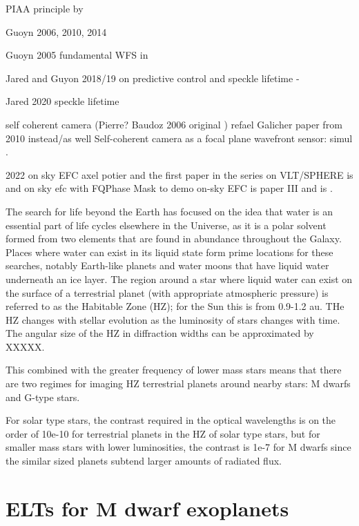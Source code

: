 \documentclass[letterpaper]{ar-1col}
\begin{document}
PIAA principle by \citet{Guyon03}


Guoyn 2006, 2010, 2014 


Guoyn 2005 fundamental WFS in \citet{Guyon05-1}

Jared and Guyon 2018/19 on predictive control and speckle lifetime - \citep{Males18}


Jared 2020 speckle lifetime \citep{Males21}

self coherent camera (Pierre? Baudoz 2006 original \citep{Baudoz06}) refael Galicher paper from 2010 instead/as well Self-coherent camera as a focal plane wavefront sensor: simul \citep{Galicher10}.




2022 on sky EFC axel potier \citep{Potier22} and the first paper in the series on VLT/SPHERE is \citep{Potier20} and on sky efc with FQPhase Mask to demo on-sky EFC is paper III and is \citet{Galicher24}.



The search for life beyond the Earth has focused on the idea that water is an essential part of life cycles elsewhere in the Universe, as it is a polar solvent formed from two elements that are found in abundance throughout the Galaxy.
%
Places where water can exist in its liquid state form prime locations for these searches, notably Earth-like planets and water moons that have liquid water underneath an ice layer.
%
The region around a star where liquid water can exist on the surface of a terrestrial planet (with appropriate atmospheric pressure) is referred to as the Habitable Zone (HZ); for the Sun this is from 0.9-1.2 au.
%
THe HZ changes with stellar evolution as the luminosity of stars changes with time.
%
The angular size of the HZ in diffraction widths can be approximated by XXXXX. 

This combined with the greater frequency of lower mass stars means that there are two regimes for imaging HZ terrestrial planets around nearby stars: M dwarfs and G-type stars.

For solar type stars, the contrast required in the optical wavelengths is on the order of 10e-10 for terrestrial planets in the HZ of solar type stars, but for smaller mass stars with lower luminosities, the contrast is 1e-7 for M dwarfs since the similar sized planets subtend larger amounts of radiated flux.
%
\section{ELTs for M dwarf exoplanets}
\end{document}
